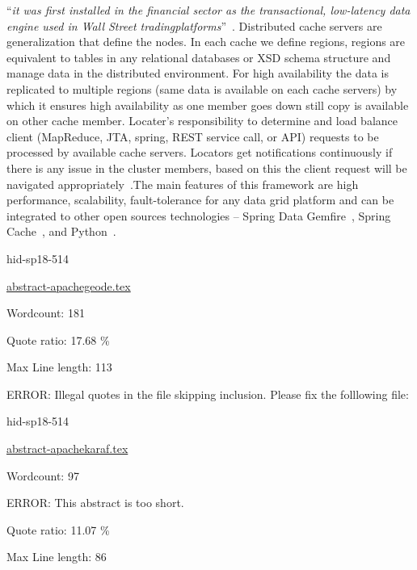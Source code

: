 \color{blue}``\emph{it was
first installed in the financial sector as the transactional,
low-latency data engine used in Wall Street tradingplatforms}''\color{black}~\cite{hid-sp18-514-apachegeodewiki}.
Distributed cache servers are generalization that define the nodes. In
each cache we define regions, regions are equivalent to tables in any
relational databases or XSD schema structure and manage data in the
distributed environment. For high availability the data is replicated
to multiple regions (same data is available on each cache servers) by
which it ensures high availability as one member goes down still copy
is available on other cache member. Locater’s responsibility to
determine and load balance client (MapReduce, JTA, spring, REST service
call, or API) requests to be processed by available cache servers.
Locators get notifications continuously if there is any issue in the
cluster members, based on this the client request will be navigated
appropriately~\cite{hid-sp18-514-apachegeodewiki}.The main features of
this framework are high performance, scalability, fault-tolerance for
any data grid platform and can be integrated to other open sources
technologies – Spring Data
Gemfire~\cite{hid-sp18-514-geodespringgemfire}, Spring
Cache~\cite{hid-sp18-514-geodespringcache}, and
Python~\cite{hid-sp18-514-geodepython}.


\begin{IU}

hid-sp18-514

\href{https://github.com/cloudmesh-community/hid-sp18-514/blob/master//technology/abstract-apachegeode.tex}{abstract-apachegeode.tex}

 

Wordcount: 181


Quote ratio: 17.68 \%
 
Max Line length: 113
\end{IU}

ERROR: Illegal quotes in the file skipping inclusion. Please fix the folllowing file:

\begin{IU}

hid-sp18-514

\href{https://github.com/cloudmesh-community/hid-sp18-514/blob/master//technology/abstract-apachekaraf.tex}{abstract-apachekaraf.tex}

 

Wordcount: 97

ERROR: This abstract is too short.


Quote ratio: 11.07 \%
 
Max Line length: 86
\end{IU}

